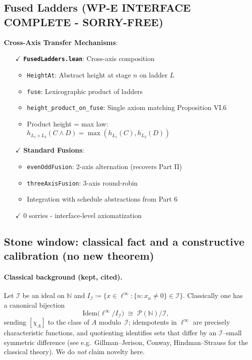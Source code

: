 \documentclass[11pt]{article}
\theoremstyle{definition}
\theoremstyle{remark}
\begin{document}
\subsection{Fused Ladders (WP-E INTERFACE COMPLETE - SORRY-FREE)}

\textbf{Cross-Axis Transfer Mechanisms}:
\begin{itemize}
\item[$\checkmark$] \textbf{\texttt{FusedLadders.lean}}: Cross-axis composition
  \begin{itemize}
  \item \texttt{HeightAt}: Abstract height at stage $n$ on ladder $L$
  \item \texttt{fuse}: Lexicographic product of ladders
  \item \texttt{height\_product\_on\_fuse}: Single axiom matching Proposition VI.6
  \item Product height = max law: $h_{L_1 \times L_2}(C \land D) = \max(h_{L_1}(C), h_{L_2}(D))$
  \end{itemize}
\item[$\checkmark$] \textbf{Standard Fusions}:
  \begin{itemize}
  \item \texttt{evenOddFusion}: 2-axis alternation (recovers Part II)
  \item \texttt{threeAxisFusion}: 3-axis round-robin
  \item Integration with schedule abstractions from Part 6
  \end{itemize}
\item[$\checkmark$] 0 sorries - interface-level axiomatization
\end{itemize}

\subsection{Stone window: classical fact and a constructive calibration (no new theorem)}
\label{subsec:stone-window}

\paragraph{Classical background (kept, cited).}
Let $\mathcal I$ be an ideal on $\mathbb N$ and
$I_{\mathcal I} \coloneqq \{x\in \ell^\infty : \{n : x_n\neq 0\}\in \mathcal I\}$.
Classically one has a canonical bijection
\[
  \mathrm{Idem}\bigl(\ell^\infty / I_{\mathcal I}\bigr)
  \;\cong\;
  \mathcal P(\mathbb N)/\mathcal I,
\]
sending $[\chi_A]$ to the class of $A$ modulo~$\mathcal I$; idempotents in $\ell^\infty$ are precisely characteristic functions, and quotienting identifies sets that differ by an $\mathcal I$--small symmetric difference
(see e.g.\ Gillman--Jerison, Conway, Hindman--Strauss for the classical theory). We do \emph{not} claim novelty here.
\end{document}
